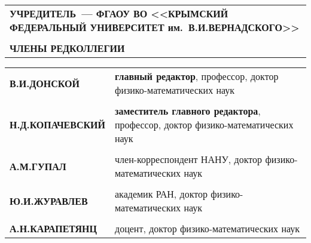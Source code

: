 \def\baselinestretch{1}
\thispagestyle{empty}

\myinter=2pt

\parindent=0mm
{\scriptsize\sf
    \renewcommand{\arraystretch}{0}
    \begin{tabular}{l}
        \textbf{УЧРЕДИТЕЛЬ~--- ФГАОУ ВО <<КРЫМСКИЙ ФЕДЕРАЛЬНЫЙ УНИВЕРСИТЕТ им.~В.\;И.\;ВЕРНАДСКОГО>>}\\
        
        \rule{0pt}{0.6cm}\\%
        \textbf{ЧЛЕНЫ РЕДКОЛЛЕГИИ}\\
    \end{tabular}
}

\vspace{0.3cm} {\renewcommand{\arraystretch}{0.4}
\begin{tabular}{ll}
{\qquad\scriptsize\sf \textbf{В.\;И.\;ДОНСКОЙ}}        & {\scriptsize\sf \textbf{главный редактор}, профессор, доктор физико-математических наук}\\

\rule{0pt}{4pt} & \\
{\qquad\scriptsize\sf \textbf{Н.\;Д.\;КОПАЧЕВСКИЙ}}   & {\scriptsize\sf \textbf{заместитель главного редактора}, профессор, доктор физико-математических наук}\\


\rule{0pt}{4pt} & \\
{\qquad\scriptsize\sf \textbf{А.\;М.\;ГУПАЛ}}          & {\scriptsize\sf член-корреспондент НАНУ, доктор физико-математических наук}\\

\rule{0pt}{4pt} & \\
{\qquad\scriptsize\sf \textbf{Ю.\;И.\;ЖУРАВЛЕВ}}       & {\scriptsize\sf академик РАН, доктор физико-математических наук}\\

\rule{0pt}{4pt} & \\
{\qquad\scriptsize\sf \textbf{А.\;Н.\;КАРАПЕТЯНЦ}}   & {\scriptsize\sf доцент, доктор физико-математических наук}\\


\end{tabular}}
